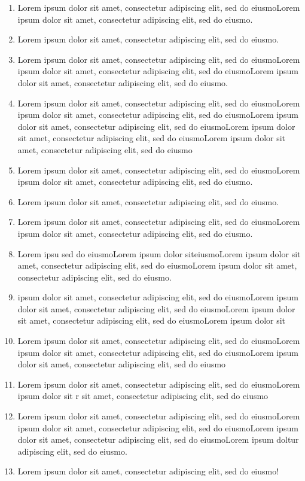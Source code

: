 \documentclass{article}
\newcommand{\preparationitem}[1]{
    \normalsize\item{#1}
}
\begin{document}
\begin{paracol}{2}
\begin{leftcolumn}
\begin{enumerate}[wide, labelwidth=!, labelindent=0pt]
        \preparationitem{Lorem ipsum dolor sit amet, consectetur adipiscing elit, sed do eiusmoLorem ipsum dolor sit amet, consectetur adipiscing elit, sed do eiusmo.}
        \preparationitem{Lorem ipsum dolor sit amet, consectetur adipiscing elit, sed do eiusmo.}
        \preparationitem{Lorem ipsum dolor sit amet, consectetur adipiscing elit, sed do eiusmoLorem ipsum dolor sit amet, consectetur adipiscing elit, sed do eiusmoLorem ipsum dolor sit amet, consectetur adipiscing elit, sed do eiusmo.}
        \preparationitem{Lorem ipsum dolor sit amet, consectetur adipiscing elit, sed do eiusmoLorem ipsum dolor sit amet, consectetur adipiscing elit, sed do eiusmoLorem ipsum dolor sit amet, consectetur adipiscing elit, sed do eiusmoLorem ipsum dolor sit amet, consectetur adipiscing elit, sed do eiusmoLorem ipsum dolor sit amet, consectetur adipiscing elit, sed do eiusmo}
        \preparationitem{Lorem ipsum dolor sit amet, consectetur adipiscing elit, sed do eiusmoLorem ipsum dolor sit amet, consectetur adipiscing elit, sed do eiusmo.}
        \preparationitem{Lorem ipsum dolor sit amet, consectetur adipiscing elit, sed do eiusmo.}
        \preparationitem{Lorem ipsum dolor sit amet, consectetur adipiscing elit, sed do eiusmoLorem ipsum dolor sit amet, consectetur adipiscing elit, sed do eiusmo.}
        \preparationitem{Lorem ipsu sed do eiusmoLorem ipsum dolor siteiusmoLorem ipsum dolor sit amet, consectetur adipiscing elit, sed do eiusmoLorem ipsum dolor sit amet, consectetur adipiscing elit, sed do eiusmo.}
        \preparationitem{ipsum dolor sit amet, consectetur adipiscing elit, sed do eiusmoLorem ipsum dolor sit amet, consectetur adipiscing elit, sed do eiusmoLorem ipsum dolor sit amet, consectetur adipiscing elit, sed do eiusmoLorem ipsum dolor sit}
        \preparationitem{Lorem ipsum dolor sit amet, consectetur adipiscing elit, sed do eiusmoLorem ipsum dolor sit amet, consectetur adipiscing elit, sed do eiusmoLorem ipsum dolor sit amet, consectetur adipiscing elit, sed do eiusmo}
        \preparationitem{Lorem ipsum dolor sit amet, consectetur adipiscing elit, sed do eiusmoLorem ipsum dolor sit r sit amet, consectetur adipiscing elit, sed do eiusmo}
        \preparationitem{Lorem ipsum dolor sit amet, consectetur adipiscing elit, sed do eiusmoLorem ipsum dolor sit amet, consectetur adipiscing elit, sed do eiusmoLorem ipsum dolor sit amet, consectetur adipiscing elit, sed do eiusmoLorem ipsum doltur adipiscing elit, sed do eiusmo.}
        \preparationitem{Lorem ipsum dolor sit amet, consectetur adipiscing elit, sed do eiusmo!}


\end{enumerate}
\end{leftcolumn}
\end{paracol}
\end{document}
